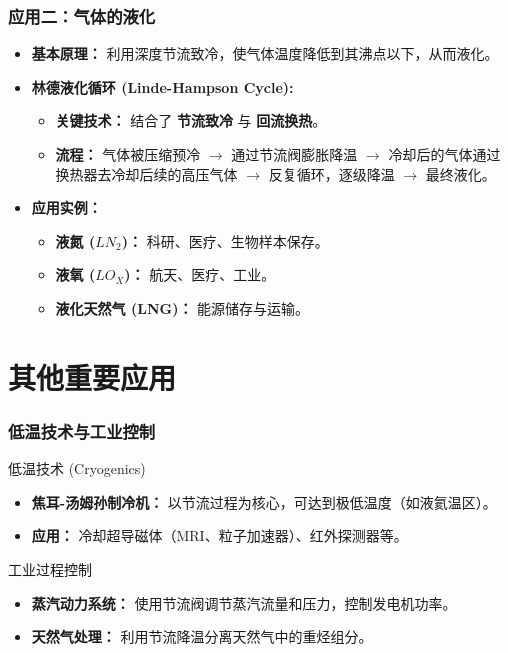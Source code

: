 \documentclass{beamer}
\begin{document}
\begin{frame}
  \frametitle{应用二：气体的液化}
    \begin{itemize}
    \item \textbf{基本原理：} 利用\alert{深度节流致冷}，使气体温度降低到其沸点以下，从而液化。
    \vfill
    \item \textbf{林德液化循环 (Linde-Hampson Cycle):}
    \begin{itemize}
      \item \textbf{关键技术：} 结合了 \textbf{\alert{节流致冷}} 与 \textbf{\alert{回流换热}}。
      \item \textbf{流程：} 气体被压缩预冷 $\rightarrow$ 通过节流阀膨胀降温 $\rightarrow$ 冷却后的气体通过换热器去冷却后续的高压气体 $\rightarrow$ \alert{反复循环，逐级降温} $\rightarrow$ 最终液化。
    \end{itemize}
    \vfill
    \item \textbf{应用实例：}
    \begin{itemize}
        \item \textbf{液氮 ($LN_2$)：} 科研、医疗、生物样本保存。
        \item \textbf{液氧 ($LO_X$)：} 航天、医疗、工业。
        \item \textbf{液化天然气 (LNG)：} 能源储存与运输。
    \end{itemize}
  \end{itemize}
\end{frame}


\section{其他重要应用}

\begin{frame}
  \frametitle{低温技术与工业控制}
  \begin{block}{低温技术 (Cryogenics)}
    \begin{itemize}
        \item \textbf{焦耳-汤姆孙制冷机：} 以节流过程为核心，可达到极低温度（如液氦温区）。
        \item \textbf{应用：} 冷却超导磁体（MRI、粒子加速器）、红外探测器等。
    \end{itemize}
  \end{block}
  \vfill
  \begin{block}{工业过程控制}
    \begin{itemize}
        \item \textbf{蒸汽动力系统：} 使用节流阀调节蒸汽流量和压力，控制发电机功率。
        \item \textbf{天然气处理：} 利用节流降温分离天然气中的重烃组分。
    \end{itemize}
  \end{block}
\end{frame}
\end{document}
